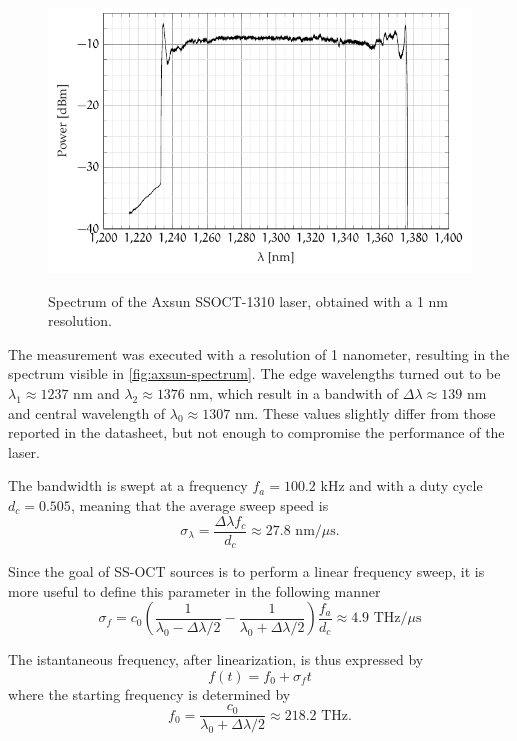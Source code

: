 \begin{figure}[hbt]
	{\myfloatalign
		\includegraphics[width=\linewidth]{gfx/tikz/axsun/spectrum}}\\
	\caption{Spectrum of the Axsun SSOCT-1310 laser, obtained with a 1 nm resolution.}\label{fig:axsun-spectrum}
\end{figure}

The measurement was executed with a resolution of 1 nanometer, resulting in the spectrum visible in \autoref{fig:axsun-spectrum}. The edge wavelengths turned out to be $\lambda_1 \approx 1237$ nm and $\lambda_2\approx1376$ nm, which result in a bandwith of $\Delta \lambda \approx 139$ nm and central wavelength of $\lambda_0\approx 1307$ nm. These values slightly differ from those reported in the datasheet, but not enough to compromise the performance of the laser. 

The bandwidth is swept at a frequency $f_a = 100.2$ kHz and with a duty cycle $d_c=0.505$, meaning that the average sweep speed is 
\begin{equation}
\sigma_{\lambda} = \frac{\Delta\lambda f_c}{d_c} \approx 27.8 \,\,\text{nm}/\mu\text{s}.
\end{equation}

Since the goal of SS-OCT sources is to perform a linear frequency sweep, it is more useful to define this parameter in the following manner
\begin{equation}\label{eq:sweep-speed}
\sigma_f = c_0 \left(	\frac{1}{\lambda_0 - \Delta\lambda/2} - \frac{1}{\lambda_0 + \Delta\lambda/2}\right) \frac{f_a}{d_c} \approx 4.9 \,\,\text{THz}/\mu\text{s}
\end{equation}

The istantaneous frequency, after linearization, is thus expressed by 
\begin{equation}
	f(t) = f_0 + \sigma_f t
\end{equation}
where the starting frequency is determined by
\begin{equation}
f_0 = \frac{c_0}{\lambda_0 + \Delta\lambda /2} \approx 218.2 \,\,\text{THz}.
\end{equation}


